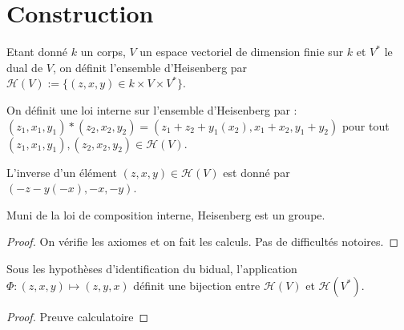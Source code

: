 \section{Construction}

\begin{definition}
    \label{def:heisenberg}
    \leanok

    Etant donné $k$ un corps, $V$ un espace vectoriel de dimension finie sur
    $k$ et $V^*$ le dual de $V$, on définit l'ensemble d'Heisenberg par 
    $\mathcal{H}(V):=\{(z,x,y) \in k\times V\times V^*\}$.
\end{definition}

\begin{definition}
    \label{def:mul_H}
    \leanok 

    On définit une loi interne sur l'ensemble d'Heisenberg par :
    $(z_1,x_1,y_1)*(z_2,x_2,y_2) = (z_1+z_2+y_1(x_2),x_1+x_2,y_1+y_2)$ pour
    tout $(z_1,x_1,y_1),(z_2,x_2,y_2)\in\mathcal{H}(V)$.
\end{definition}

\begin{definition}
    \label{def:inv_H}
    \leanok 

    L'inverse d'un élément $(z,x,y)\in\mathcal{H}(V)$ est donné par 
    $(-z- y(-x), - x ,- y)$.
\end{definition}

\begin{proposition}
    \label{prop:group_H}
    \leanok
    Muni de la loi de composition interne, Heisenberg est un groupe.
    \begin{proof}
        \leanok
        On vérifie les axiomes et on fait les calculs. Pas de difficultés
        notoires.
    \end{proof}
\end{proposition}

\begin{definition}
    \label{def:bij_H}
    \leanok 

    Sous les hypothèses d'identification du bidual, l'application 
    $\Phi : (z,x,y) \mapsto (z,y,x)$ définit une bijection 
    entre $\mathcal{H}(V)$ et $\mathcal{H}(V^*)$.
    \begin{proof}
        \leanok
        Preuve calculatoire
    \end{proof}
\end{definition}

